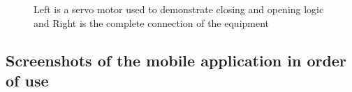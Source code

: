 \begin{figure}[h]
    \caption{Left is a servo motor used to demonstrate closing and opening logic and Right is the complete connection of the equipment }%
    \label{fig:equip}%
\end{figure}
\clearpage

\subsection{Screenshots of the mobile application in order of use}
\begin{figure}[h]%
    \centering

\end{figure}
